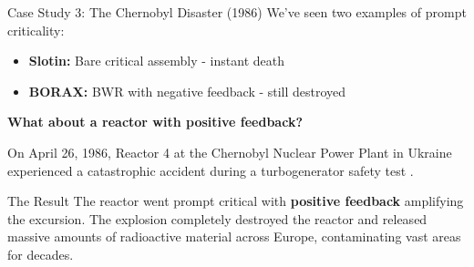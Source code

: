 \documentclass[aspectratio=169]{beamer}
\begin{document}
\begin{frame}[allowframebreaks]{Case Study 3: The Chernobyl Disaster (1986)}
    We've seen two examples of prompt criticality:
    \begin{itemize}
        \item \textbf{Slotin:} Bare critical assembly - instant death
        \item \textbf{BORAX:} BWR with negative feedback - still destroyed
    \end{itemize}

    \vspace{1em}
    \textbf{What about a reactor with positive feedback?}

    \vspace{1em}
    On April 26, 1986, Reactor 4 at the Chernobyl Nuclear Power Plant in Ukraine experienced a catastrophic accident during a turbogenerator safety test \cite{malko2002chernobyl}.

    \vspace{1em}
    \begin{alertblock}{The Result}
        The reactor went prompt critical with \textbf{positive feedback} amplifying the excursion. The explosion completely destroyed the reactor and released massive amounts of radioactive material across Europe, contaminating vast areas for decades.
    \end{alertblock}
\end{frame}
\end{document}
